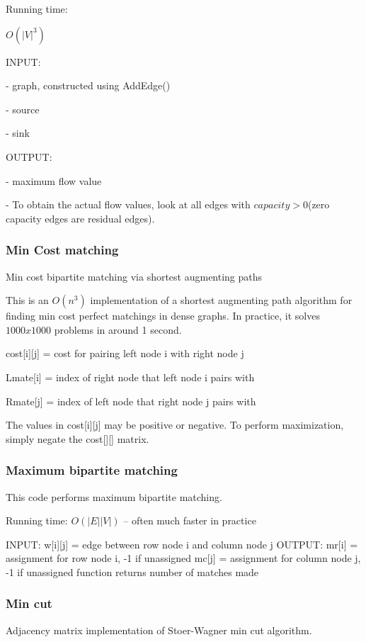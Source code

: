 \documentclass[10pt,letterpaper,twocolumn,twosided]{article}
\newcommand{\codigofuente}[1]{

\dotfill
}
\begin{document}
Running time:

$O(|V|^3)$

INPUT: 

- graph, constructed using AddEdge()

- source

- sink


OUTPUT:

- maximum flow value

- To obtain the actual flow values, look at all edges with
 $capacity > 0 $(zero capacity edges are residual edges).

\codigofuente{src/graphs/pushrelabel.cpp}

\subsubsection{Min Cost matching}

Min cost bipartite matching via shortest augmenting paths

This is an $O(n^3)$ implementation of a shortest augmenting path
algorithm for finding min cost perfect matchings in dense
graphs. In practice, it solves $1000 x 1000$ problems in around 1
second.

cost[i][j] = cost for pairing left node i with right node j

Lmate[i] = index of right node that left node i pairs with

Rmate[j] = index of left node that right node j pairs with

The values in cost[i][j] may be positive or negative. To perform
maximization, simply negate the cost[][] matrix.

\codigofuente{src/graphs/mincostmatching.cpp}

\subsubsection{Maximum bipartite matching}

This code performs maximum bipartite matching.

Running time: $O(|E| |V|)$ -- often much faster in practice


INPUT: w[i][j] = edge between row node i and column node j
OUTPUT: mr[i] = assignment for row node i, -1 if unassigned
mc[j] = assignment for column node j, -1 if unassigned
function returns number of matches made

\codigofuente{src/graphs/bipartite.cpp}

\subsubsection{Min cut}
Adjacency matrix implementation of Stoer-Wagner min cut algorithm.
\end{document}
